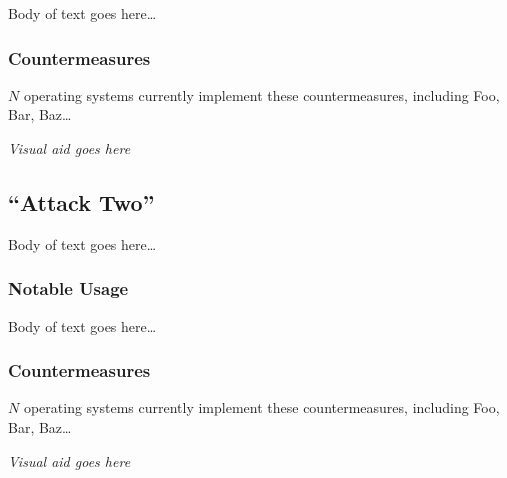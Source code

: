 \documentclass[conference]{IEEEtran}
\begin{document}
Body of text goes here\ldots

\subsubsection{Countermeasures}

$N$ operating systems currently implement these countermeasures, including Foo, Bar, Baz\ldots

\textit{Visual aid goes here}

\subsection{``Attack Two''}

Body of text goes here\ldots

\subsubsection{Notable Usage}

Body of text goes here\ldots

\subsubsection{Countermeasures}

$N$ operating systems currently implement these countermeasures, including Foo, Bar, Baz\ldots

\textit{Visual aid goes here}
\end{document}
